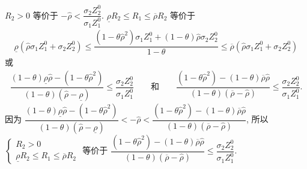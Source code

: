\documentclass[10.0pt]{article}
\begin{document}
$ R_2 > 0 $ 等价于 $ - {\hat \rho} < \dfrac{\sigma_2 Z_2^0}{\sigma_1 Z_1^0} $.
$ \underline{\rho} R_2 \leqslant R_1 \leqslant \overline{\rho} R_2 $ 等价于 
\begin{eqnarray*}
\underline{\rho} ({\hat \rho} \sigma_1 Z_1^0 + \sigma_2 Z_2^0) \leqslant \dfrac{(1 - \theta {\hat \rho}^2) \sigma_1 Z_1^0 + (1 - \theta) {\hat \rho} \sigma_2 Z_2^0}{1 - \theta} \leqslant \overline{\rho} ({\hat \rho} \sigma_1 Z_1^0 + \sigma_2 Z_2^0)
\end{eqnarray*}
或
\begin{eqnarray*}
\dfrac{(1 - \theta) \underline{\rho} {\hat \rho} - (1 - \theta {\hat \rho}^2)}{(1 - \theta) ({\hat \rho} - \underline{\rho})} \leqslant \dfrac{\sigma_2 Z_2^0}{\sigma_1 Z_1^0} \qquad \text{和} \qquad \dfrac{(1 - \theta {\hat \rho}^2) - (1 - \theta) \overline{\rho} {\hat \rho}}{(1 - \theta) (\overline{\rho} - {\hat \rho})} \leqslant \dfrac{\sigma_2 Z_2^0}{\sigma_1 Z_1^0}.
\end{eqnarray*}
因为 $ \dfrac{(1 - \theta) \underline{\rho} {\hat \rho} - (1 - \theta {\hat \rho}^2)}{(1 - \theta) ({\hat \rho} - \underline{\rho})} < - {\hat \rho} < \dfrac{(1 - \theta {\hat \rho}^2) - (1 - \theta) \overline{\rho} {\hat \rho}}{(1 - \theta) (\overline{\rho} - {\hat \rho})} $, 所以 $ \left\{ \begin{matrix} R_2 > 0 \\ \underline{\rho} R_2 \leqslant R_1 \leqslant \overline{\rho} R_2 \end{matrix} \right. $ 等价于 $ \dfrac{(1 - \theta {\hat \rho}^2) - (1 - \theta) \overline{\rho} {\hat \rho}}{(1 - \theta) (\overline{\rho} - {\hat \rho})} \leqslant \dfrac{\sigma_2 Z_2^0}{\sigma_1 Z_1^0} $.
\end{document}
